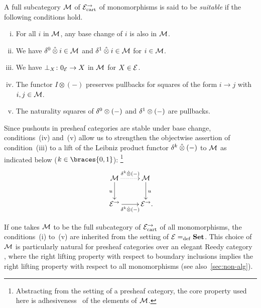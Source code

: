 \documentclass[reqno,10pt,a4paper,oneside,draft]{amsart}
\begin{document}
\begin{definition} \label{uniform-fib-presheaf-cat}
A full subcategory $\cal{M}$ of $\catE_\cart^\to$ of monomorphisms is said
to be \emph{suitable} if the following conditions hold.
\begin{enumerate}[(i)]
\item For all $i$ in $\cal{M}$, any base change of $i$ is also in $\cal{M}$.
\item We have $\lcyl \hatotimes i \in \cal{M}$ and $\rcyl \hatotimes i \in \cal{M}$ for $i \in \cal{M}$.
\item We have $\bot_X \co 0_{\cal{E}} \to X$ in $\cal{M}$ for $X \in \cal{E}$.
\item The functor $I \otimes (-)$ preserves pullbacks for squares of the form $i \to j$ with $i, j \in \cal{M}$.
\item The naturality squares of $\lcyl \otimes (-)$ and $\rcyl \otimes (-)$ are pullbacks.
\end{enumerate}
\end{definition}

\begin{remark} \label{rem-lift-suitable}
Since pushouts in presheaf categories are stable under base change, conditions~(iv) and~(v) allow us to strengthen the objectwise assertion of condition~(iii) to a lift of the Leibniz product functor $\kcyl \hatotimes (-)$ to $\cal{M}$ as indicated below ($k \in \braces{0, 1}$):%
\footnote{Abstracting from the setting of a presheaf category, the core property used here is adhesiveness~\cite{garner-lack:adhesive} of the elements of $\cal{M}$.}
\[
\xymatrix{
  \cal{M}
  \ar@{.>}[r]^{\kcyl \hatotimes (-)}
  \ar[d]_{u}
&
  \cal{M}
  \ar[d]^{u}
\\
  \catE^\to
  \ar[r]_{\kcyl \hatotimes (-)}
&
  \catE^\to
\rlap{.}}
\]
\end{remark}

If one takes $\cal{M}$ to be the full subcategory of $\catE_\cart^\to$ of all monomorphisms, the 
conditions~(i) to~(v) are inherited from the setting of $\calE \defeq \Set$. This choice of $\cal{M}$
is particularly natural for presheaf categories over an elegant Reedy category~\cite{bergner-rezk-elegant} , where the right lifting property
with respect to boundary inclusions implies the right lifting property with respect to all monomorphisms
(see also~\cref{sec:non-alg}).  
\end{document}
